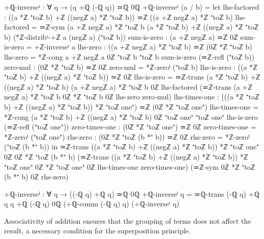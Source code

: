\documentclass[11pt,a4paper]{book}
\begin{document}
\begin{code}
+ℚ-inverseʳ : ∀ q → (q +ℚ (-ℚ q)) ≃ℚ 0ℚ
+ℚ-inverseʳ (a / b) = 
  let 
      lhs-factored : ((a *ℤ ⁺toℤ b) +ℤ ((negℤ a) *ℤ ⁺toℤ b)) ≃ℤ ((a +ℤ negℤ a) *ℤ ⁺toℤ b)
      lhs-factored = ≃ℤ-sym {(a +ℤ negℤ a) *ℤ ⁺toℤ b} {(a *ℤ ⁺toℤ b) +ℤ ((negℤ a) *ℤ ⁺toℤ b)} 
                           (*ℤ-distribʳ-+ℤ a (negℤ a) (⁺toℤ b))
      sum-is-zero : (a +ℤ negℤ a) ≃ℤ 0ℤ
      sum-is-zero = +ℤ-inverseʳ a
      lhs-zero : ((a +ℤ negℤ a) *ℤ ⁺toℤ b) ≃ℤ (0ℤ *ℤ ⁺toℤ b)
      lhs-zero = *ℤ-cong {a +ℤ negℤ a} {0ℤ} {⁺toℤ b} {⁺toℤ b} sum-is-zero (≃ℤ-refl (⁺toℤ b))
      zero-mul : (0ℤ *ℤ ⁺toℤ b) ≃ℤ 0ℤ
      zero-mul = *ℤ-zeroˡ (⁺toℤ b)
      lhs-is-zero : ((a *ℤ ⁺toℤ b) +ℤ ((negℤ a) *ℤ ⁺toℤ b)) ≃ℤ 0ℤ
      lhs-is-zero = ≃ℤ-trans {(a *ℤ ⁺toℤ b) +ℤ ((negℤ a) *ℤ ⁺toℤ b)} {(a +ℤ negℤ a) *ℤ ⁺toℤ b} {0ℤ}
                            lhs-factored 
                            (≃ℤ-trans {(a +ℤ negℤ a) *ℤ ⁺toℤ b} {0ℤ *ℤ ⁺toℤ b} {0ℤ} lhs-zero zero-mul)
      lhs-times-one : (((a *ℤ ⁺toℤ b) +ℤ ((negℤ a) *ℤ ⁺toℤ b)) *ℤ ⁺toℤ one⁺) ≃ℤ (0ℤ *ℤ ⁺toℤ one⁺)
      lhs-times-one = *ℤ-cong {(a *ℤ ⁺toℤ b) +ℤ ((negℤ a) *ℤ ⁺toℤ b)} {0ℤ} {⁺toℤ one⁺} {⁺toℤ one⁺}
                             lhs-is-zero (≃ℤ-refl (⁺toℤ one⁺))
      zero-times-one : (0ℤ *ℤ ⁺toℤ one⁺) ≃ℤ 0ℤ
      zero-times-one = *ℤ-zeroˡ (⁺toℤ one⁺)
      rhs-zero : (0ℤ *ℤ ⁺toℤ (b *⁺ b)) ≃ℤ 0ℤ
      rhs-zero = *ℤ-zeroˡ (⁺toℤ (b *⁺ b))
  in ≃ℤ-trans {((a *ℤ ⁺toℤ b) +ℤ ((negℤ a) *ℤ ⁺toℤ b)) *ℤ ⁺toℤ one⁺} {0ℤ} {0ℤ *ℤ ⁺toℤ (b *⁺ b)}
             (≃ℤ-trans {((a *ℤ ⁺toℤ b) +ℤ ((negℤ a) *ℤ ⁺toℤ b)) *ℤ ⁺toℤ one⁺} {0ℤ *ℤ ⁺toℤ one⁺} {0ℤ}
                       lhs-times-one zero-times-one)
             (≃ℤ-sym {0ℤ *ℤ ⁺toℤ (b *⁺ b)} {0ℤ} rhs-zero)

+ℚ-inverseˡ : ∀ q → ((-ℚ q) +ℚ q) ≃ℚ 0ℚ
+ℚ-inverseˡ q = ≃ℚ-trans {(-ℚ q) +ℚ q} {q +ℚ (-ℚ q)} {0ℚ} (+ℚ-comm (-ℚ q) q) (+ℚ-inverseʳ q)
\end{code}

Associativity of addition ensures that the grouping of terms does not affect the result, a necessary condition for the superposition principle.
\end{document}
